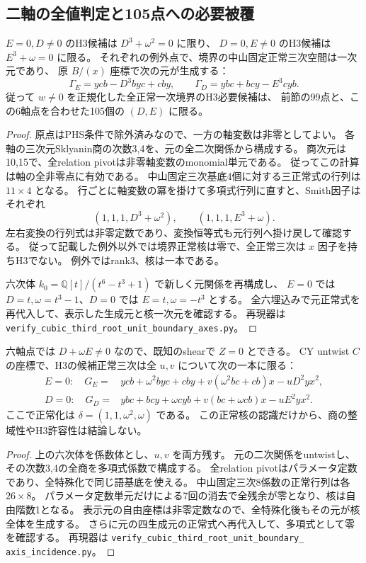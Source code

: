\subsection{二軸の全値判定と105点への必要被覆}
\label{subsec:cubic-third-root-unit-boundary-axes}
\begin{theorem}[軸上の全境界正常核]
\label{thm:cubic-third-root-unit-boundary-axes}
$E=0,D\ne0$ のH3候補は $D^3+\omega^2=0$ に限り、
$D=0,E\ne0$ のH3候補は $E^3+\omega=0$ に限る。
それぞれの例外点で、境界の中山固定正常三次空間は一次元であり、
原 $B/(x)$ 座標で次の元が生成する：
\[
 \Gamma_E=ycb-D^3byc+cby,\qquad
 \Gamma_D=ybc+bcy-E^3cyb.
\]
従って $w\ne0$ を正規化した全正常一次境界のH3必要候補は、
前節の99点と、この6軸点を合わせた105個の $(D,E)$ に限る。
\end{theorem}
\begin{proof}
原点はPHS条件で除外済みなので、一方の軸変数は非零としてよい。
各軸の三次元Sklyanin商の次数3,4を、元の全二次関係から構成する。
商次元は10,15で、全relation pivotは非零軸変数のmonomial単元である。
従ってこの計算は軸の全非零点に有効である。
中山固定三次基底4個に対する三正常式の行列は $11\times4$ となる。
行ごとに軸変数の冪を掛けて多項式行列に直すと、Smith因子はそれぞれ
\[
 (1,1,1,D^3+\omega^2),\qquad
 (1,1,1,E^3+\omega).
\]
左右変換の行列式は非零定数であり、変換恒等式も元行列へ掛け戻して確認する。
従って記載した例外以外では境界正常核は零で、全正常三次は $x$ 因子を持ちH3でない。
例外ではrank3、核は一本である。

六次体 $k_0=\mathbb Q[t]/(t^6-t^3+1)$ で新しく元関係を再構成し、
$E=0$ では $D=t,\omega=t^3-1$、$D=0$ では $E=t,\omega=-t^3$ とする。
全六埋込みで元正常式を再代入して、表示した生成元と核一次元を確認する。
再現器は \texttt{verify\_cubic\_third\_root\_unit\_boundary\_axes.py}。
\end{proof}

\begin{proposition}[六軸点の全変形正常三次]
\label{prop:cubic-third-root-unit-boundary-axis-incidence}
六軸点では $D+\omega E\ne0$ なので、既知のshearで $Z=0$ とできる。
CY untwist $C$ の座標で、H3の候補正常三次は全 $u,v$ について次の一本に限る：
\begin{align*}
 E=0:\quad G_E={}&ycb+\omega^2byc+cby
           +v(\omega^2bc+cb)x-uD^2yx^2,\\
 D=0:\quad G_D={}&ybc+bcy+\omega cyb
           +v(bc+\omega cb)x-uE^2yx^2.
\end{align*}
ここで正常化は $\delta=(1,1,\omega^2,\omega)$ である。
この正常核の認識だけから、商の整域性やH3許容性は結論しない。
\end{proposition}
\begin{proof}
上の六次体を係数体とし、$u,v$ を両方残す。
元の二次関係をuntwistし、その次数3,4の全商を多項式係数で構成する。
全relation pivotはパラメータ定数であり、全特殊化で同じ語基底を使える。
中山固定三次8係数の正常行列は各 $26\times8$。
パラメータ定数単元だけによる7回の消去で全残余が零となり、核は自由階数1となる。
表示元の自由座標は非零定数なので、全特殊化後もその元が核全体を生成する。
さらに元の四生成元の正常式へ再代入して、多項式として零を確認する。
再現器は \texttt{verify\_cubic\_third\_root\_unit\_boundary\_}\\
\texttt{axis\_incidence.py}。
\end{proof}

